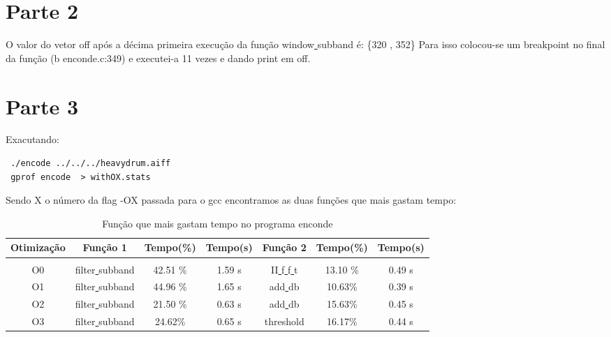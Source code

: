 \documentclass[10pt,a4paper]{article}
\begin{document}








\section{Parte 2}
O valor do vetor off após a décima primeira execução da função
window\underline{ }subband é: \{320 , 352\} 
Para isso colocou-se um breakpoint no final da função (b enconde.c:349) e executei-a 11 vezes e dando print em off.
\section{Parte 3}
Exacutando:
\begin{verbatim}
 ./encode ../../../heavydrum.aiff 
 gprof encode  > withOX.stats
\end{verbatim}
Sendo X o número da flag -OX passada para o gcc encontramos as duas
funções que mais gastam tempo:

\begin{table}[h!]
  \caption{Função que mais gastam tempo no programa enconde}
  \begin{tabular}{ccccccc}
    Otimização & Função 1 & Tempo(\%) & Tempo(s) & Função 2  & Tempo(\%) &
    Tempo(s)\\
    \hline\\
    O0 & filter\underline{ }subband &42.51 \% &1.59 s &
    II\underline{ }f\underline{ }f\underline{ }t& 13.10 \%& 0.49 s\\
    O1 & filter\underline{ }subband & 44.96 \%& 1.65 s &
    add\underline{ }db& 10.63\%& 0.39 s\\
    O2 &
    filter\underline{ }subband& 21.50 \%& 0.63 s &
    add\underline{ }db &15.63\% &0.45 s\\
    O3 &
    filter\underline{ }subband &24.62\%& 0.65 s&
    threshold & 16.17\%& 0.44 s


  \end{tabular}
\end{table}
\end{document}
